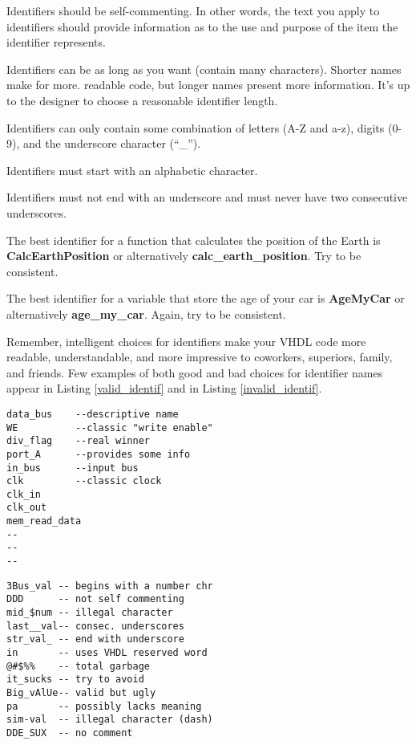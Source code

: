 \begin{my_list}
\item Identifiers should be self-commenting. In other words, the text you apply to identifiers should provide information as to the use and purpose of the item the identifier represents.
\item Identifiers can be as long as you want (contain many characters). Shorter names make for more.
readable code, but longer names present more information. It's up to the designer to choose a reasonable identifier length.
\item Identifiers can only contain some combination of letters (A-Z and a-z), digits (0-9), and the underscore character (``\_'').
\item Identifiers must start with an alphabetic character.
\item Identifiers must not end with an underscore and must never have two consecutive underscores.
\item The best identifier for a function that calculates the position of the Earth is \textbf{CalcEarthPosition} or alternatively \textbf{calc\_earth\_position}. Try to be consistent.
\item The best identifier for a variable that store the age of your car is \textbf{AgeMyCar} or alternatively \textbf{age\_my\_car}. Again, try to be consistent.
\end{my_list}
Remember, intelligent choices for identifiers make your VHDL code more readable, understandable, and more impressive to coworkers, superiors, family, and friends. Few examples of both good and bad choices for identifier names appear in Listing \ref{valid_identif} and in Listing \ref{invalid_identif}.\\
\begin{minipage}[lt]{0.49\linewidth}
\vspace{5pt}
\begin{lstlisting}[label=valid_identif, caption=Valid identifies.]
data_bus	--descriptive name
WE			--classic "write enable"
div_flag	--real winner
port_A		--provides some info
in_bus		--input bus
clk			--classic clock
clk_in
clk_out
mem_read_data
--
--
--
\end{lstlisting}
\end{minipage}
\begin{minipage}[tr]{0.49\linewidth}
\vspace{5pt}
\begin{flushright}
\begin{lstlisting}[label=invalid_identif, caption=Invalid identifies.]
3Bus_val -- begins with a number chr
DDD      -- not self commenting
mid_$num -- illegal character
last__val-- consec. underscores
str_val_ -- end with underscore
in       -- uses VHDL reserved word
@#$%%    -- total garbage
it_sucks -- try to avoid
Big_vAlUe-- valid but ugly
pa       -- possibly lacks meaning
sim-val  -- illegal character (dash)
DDE_SUX  -- no comment
\end{lstlisting}
\end{flushright}
\end{minipage}
\clearpage
